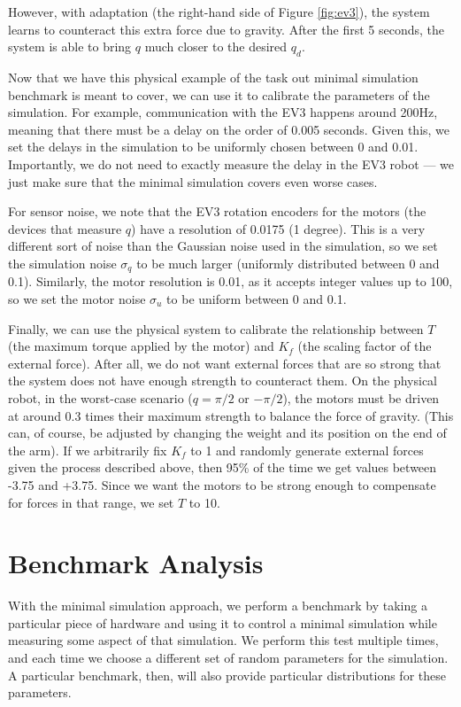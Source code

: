 \documentclass{frontiersSCNS} %
\begin{document}
However, with adaptation (the right-hand side of Figure \ref{fig:ev3}),
the system learns to counteract this extra force due to gravity.  After
the first 5 seconds, the system is able to bring $q$ much closer to the
desired $q_d$.

Now that we have this physical example of the task out minimal simulation
benchmark is meant to cover, we can use it to calibrate the parameters of
the simulation.  For example, communication with the EV3 happens around
200Hz, meaning that there must be a delay on the order of 0.005 seconds.  Given
this, we set the delays in the simulation to be uniformly chosen between
0 and 0.01.  Importantly, we do not need to exactly measure the delay in the
EV3 robot --- we just make sure that the minimal simulation covers even worse
cases.

For sensor noise, we note that the EV3 rotation encoders for the motors (the
devices that measure $q$) have a resolution of 0.0175 (1 degree).  This is a
very different sort of noise than the Gaussian noise used in the simulation,
so we set the simulation noise $\sigma_q$ to be much larger (uniformly distributed
between 0 and 0.1).  Similarly, the motor resolution is 0.01, as it accepts 
integer values up to 100, so we set the motor noise $\sigma_u$ to be uniform between
0 and 0.1.

Finally, we can use the physical system to calibrate the relationship between
$T$ (the maximum torque applied by the motor) and $K_f$ (the scaling factor
of the external force).  After all, we do not want external forces that are
so strong that the system does not have enough strength to counteract them.
On the physical robot, in the worst-case scenario ($q=\pi/2$ or $-\pi/2$),
the motors must be driven at around 0.3 times their maximum strength to
balance the force of gravity.  (This can, of course, be adjusted by changing
the weight and its position on the end of the arm).  If we arbitrarily fix $K_f$ to 1 and randomly
generate external forces given the process described above, then 95\% of
the time we get values between -3.75 and +3.75.  Since we want the motors to
be strong enough to compensate for forces in that range, we set $T$ to 10.

\section{Benchmark Analysis}

With the minimal simulation approach, we perform a benchmark by taking a
particular piece of hardware and using it to control a minimal simulation while
measuring some aspect of that simulation.  We perform this test multiple times,
and each time we choose a different set of random parameters for the
simulation.  A particular benchmark, then, will also provide particular
distributions for these parameters.
\end{document}
